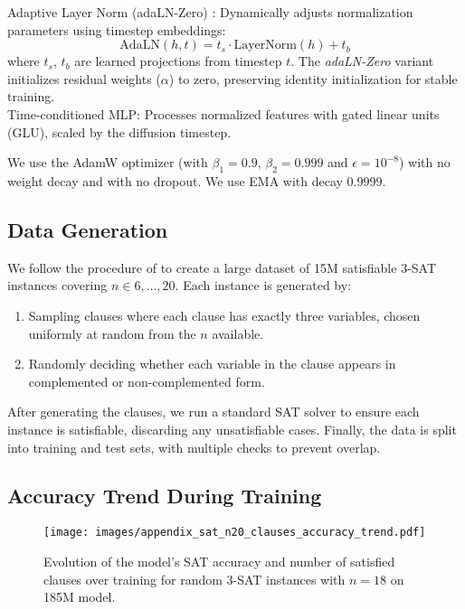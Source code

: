 Adaptive Layer Norm (adaLN-Zero) \cite{xu2019adaptivelayernormalization}: Dynamically adjusts normalization parameters using timestep embeddings:
\begin{equation}
    \text{AdaLN}(h,t) = t_s \cdot \text{LayerNorm}(h) + t_b
\end{equation}
where $t_s$, $t_b$ are learned projections from timestep $t$. The \textit{adaLN-Zero} variant initializes residual weights ($\alpha$) to zero, preserving identity initialization for stable training.\\

Time-conditioned MLP: Processes normalized features with gated linear units (GLU), scaled by the diffusion timestep.

We use the AdamW optimizer \cite{loshchilov2018decoupled} (with $\beta_1 = 0.9$, $\beta_2 = 0.999$ and $\epsilon = 10^{-8}$) with no weight decay and with no dropout.  We use EMA with decay $0.9999$.

\subsection{Data Generation}
We follow the procedure of \citet{ye2024autoregressiondiscretediffusioncomplex} to create a large dataset of 15M satisfiable 3-SAT instances covering $n \in {6,\dots,20}$. Each instance is generated by: 
\begin{enumerate}
\item Sampling clauses where each clause has exactly three variables, chosen uniformly at random from the $n$ available. 
\item Randomly deciding whether each variable in the clause appears in complemented or non-complemented form. 
\end{enumerate} 
After generating the clauses, we run a standard SAT solver to ensure each instance is satisfiable, discarding any unsatisfiable cases. Finally, the data is split into training and test sets, with multiple checks to prevent overlap.


\subsection{Accuracy Trend During Training}
\label{app:sat_accuracy_trend}

\begin{figure}[t]
  \centering
  \texttt{[image: images/appendix\_sat\_n20\_clauses\_accuracy\_trend.pdf]}
  \caption{Evolution of the model’s SAT accuracy and number of satisfied clauses over training for random 3-SAT instances with $n=18$ on 185M model.}
  \label{fig:sat_n_18_accuracy_trend}
\end{figure}

